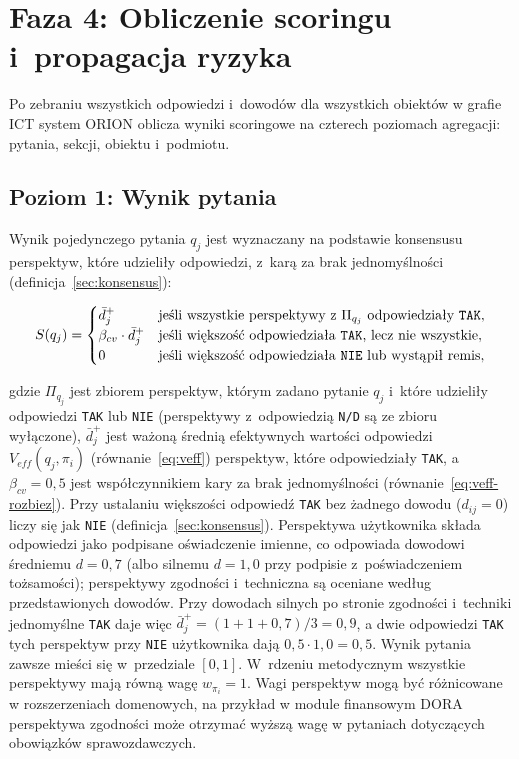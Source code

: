\section{Faza 4: Obliczenie scoringu
          i~propagacja ryzyka}
\label{sec:faza4}

Po zebraniu wszystkich odpowiedzi i~dowodów
dla wszystkich obiektów w grafie ICT system ORION
oblicza wyniki scoringowe na czterech poziomach
agregacji: pytania, sekcji, obiektu i~podmiotu.

\subsection{Poziom 1: Wynik pytania}
\label{sec:wynik-pytania}

Wynik pojedynczego pytania $q_j$ jest wyznaczany
na podstawie konsensusu perspektyw, które udzieliły
odpowiedzi, z~karą za brak jednomyślności
(definicja~\ref{sec:konsensus}):

\begin{equation}
S(q_j) =
\begin{cases}
\bar{d}^{+}_j & \text{jeśli wszystkie perspektywy z~$\Pi_{q_j}$ odpowiedziały \texttt{TAK}}, \\
\beta_{cv} \cdot \bar{d}^{+}_j & \text{jeśli większość odpowiedziała \texttt{TAK}, lecz nie wszystkie}, \\
0 & \text{jeśli większość odpowiedziała \texttt{NIE} lub wystąpił remis},
\end{cases}
\label{eq:wynik-pytania}
\end{equation}

\noindent gdzie $\Pi_{q_j}$ jest zbiorem perspektyw,
którym zadano pytanie $q_j$ i~które udzieliły odpowiedzi
\texttt{TAK} lub \texttt{NIE} (perspektywy z~odpowiedzią
\texttt{N/D} są ze zbioru wyłączone), $\bar{d}^{+}_j$ jest ważoną
średnią efektywnych wartości odpowiedzi $V_{eff}(q_j, \pi_i)$
(równanie~\eqref{eq:veff}) perspektyw, które odpowiedziały \texttt{TAK},
a $\beta_{cv} = 0{,}5$ jest współczynnikiem kary za brak jednomyślności
(równanie~\eqref{eq:veff-rozbiez}). Przy ustalaniu większości odpowiedź \texttt{TAK} bez żadnego dowodu ($d_{ij} = 0$) liczy się jak \texttt{NIE} (definicja~\ref{sec:konsensus}). Perspektywa użytkownika składa odpowiedzi jako podpisane oświadczenie imienne, co odpowiada dowodowi średniemu $d = 0{,}7$ (albo silnemu $d = 1{,}0$ przy podpisie z~poświadczeniem tożsamości); perspektywy zgodności i~techniczna są oceniane według przedstawionych dowodów. Przy dowodach silnych po stronie zgodności i~techniki jednomyślne \texttt{TAK} daje więc $\bar{d}^{+}_j = (1 + 1 + 0{,}7)/3 = 0{,}9$, a dwie odpowiedzi \texttt{TAK} tych perspektyw przy \texttt{NIE} użytkownika dają $0{,}5 \cdot 1{,}0 = 0{,}5$. Wynik pytania zawsze mieści się w~przedziale $[0, 1]$.
W~rdzeniu metodycznym wszystkie perspektywy mają równą wagę
$w_{\pi_i} = 1$. Wagi perspektyw mogą być
różnicowane w rozszerzeniach domenowych,
na przykład w module finansowym DORA perspektywa
zgodności może otrzymać wyższą wagę w pytaniach
dotyczących obowiązków sprawozdawczych.


